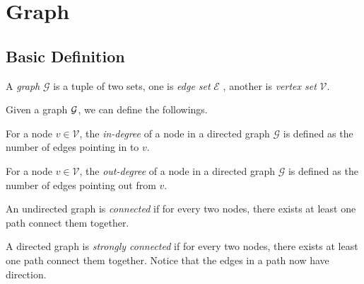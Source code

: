 \chapter{Graph}
\section{Basic Definition}
\begin{definition}[Graph]
	A \emph{graph} \(\mathcal{G}\) is a tuple of two sets, one is \emph{edge set} \(\mathcal{E}\) , another is \emph{vertex set} \(\mathcal{V}\).
\end{definition}

\begin{definition*}
	Given a graph \(\mathcal{\MakeUppercase{g}} \), we can define the followings.
	\begin{definition}[In-degree]
		For a node \(v\in\mathcal{V}\), the \emph{in-degree} of a node in a directed graph \(\mathcal{G}\) is defined as the number of edges pointing in to \(v\).
	\end{definition}

	\begin{definition}
		For a node \(v\in\mathcal{V}\), the \emph{out-degree} of a node in a directed graph \(\mathcal{G}\) is defined as the number of edges pointing out from \(v\).
	\end{definition}
\end{definition*}

\begin{definition}[Connected]
	An undirected graph is \emph{connected} if for every two nodes, there exists at least one path connect them together.
\end{definition}

\begin{definition}
	A directed graph is \emph{strongly connected} if for every two nodes, there exists at least one path connect them together. Notice that the edges in a path now
	have direction.
\end{definition}